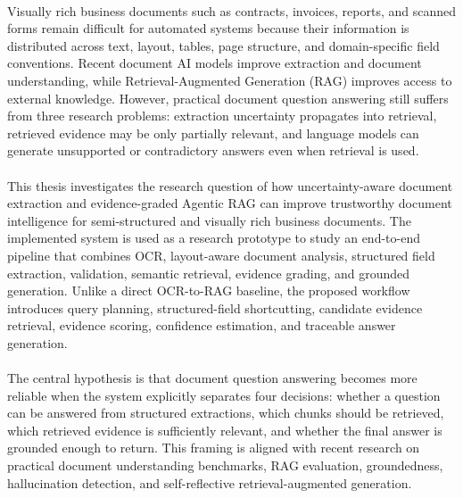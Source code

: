 \paragraph{} Visually rich business documents such as contracts, invoices, reports, and scanned forms remain difficult for automated systems because their information is distributed across text, layout, tables, page structure, and domain-specific field conventions. Recent document AI models improve extraction and document understanding, while Retrieval-Augmented Generation (RAG) improves access to external knowledge. However, practical document question answering still suffers from three research problems: extraction uncertainty propagates into retrieval, retrieved evidence may be only partially relevant, and language models can generate unsupported or contradictory answers even when retrieval is used.

\paragraph{} This thesis investigates the research question of how uncertainty-aware document extraction and evidence-graded Agentic RAG can improve trustworthy document intelligence for semi-structured and visually rich business documents. The implemented system is used as a research prototype to study an end-to-end pipeline that combines OCR, layout-aware document analysis, structured field extraction, validation, semantic retrieval, evidence grading, and grounded generation. Unlike a direct OCR-to-RAG baseline, the proposed workflow introduces query planning, structured-field shortcutting, candidate evidence retrieval, evidence scoring, confidence estimation, and traceable answer generation.

\paragraph{} The central hypothesis is that document question answering becomes more reliable when the system explicitly separates four decisions: whether a question can be answered from structured extractions, which chunks should be retrieved, which retrieved evidence is sufficiently relevant, and whether the final answer is grounded enough to return. This framing is aligned with recent research on practical document understanding benchmarks, RAG evaluation, groundedness, hallucination detection, and self-reflective retrieval-augmented generation.

